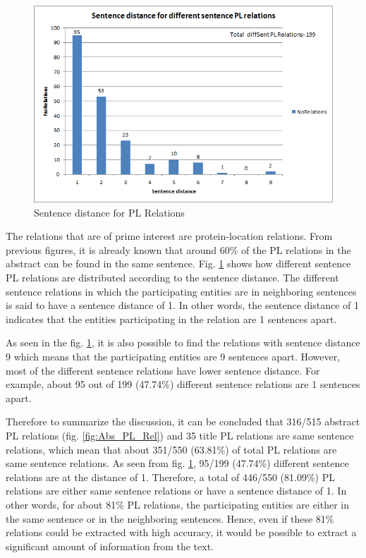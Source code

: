 \begin{figure}
\centering
\includegraphics[scale=0.7]{figures/SentenceDistance_PLRel.png}
\caption{Sentence distance for PL Relations}\label{fig:SentDistancePL}
\end{figure}

The relations that are of prime interest are protein-location relations. From previous figures, it is already known that around 60\% of the PL relations in the abstract can be found in the same sentence. Fig. \ref{fig:SentDistancePL} shows how different sentence PL relations are distributed according to the sentence distance. The different sentence relations in which the participating entities are in neighboring sentences is said to have a sentence distance of 1. In other words, the sentence distance of 1 indicates that the entities participating in the relation are 1 sentences apart. 

As seen in the fig. \ref{fig:SentDistancePL}, it is also possible to find the relations with sentence distance 9 which means that the participating entities are 9 sentences apart. However, most of the different sentence relations have lower sentence distance. For example, about 95 out of 199 (47.74\%) different sentence relations are 1 sentences apart.


Therefore to summarize the discussion, it can be concluded that 316/515 abstract PL relations (fig. \ref{fig:Abs_PL_Rel}) and 35 title PL relations are same sentence relations, which mean that about 351/550 (63.81\%) of total PL relations are same sentence relations. As seen from  fig. \ref{fig:SentDistancePL}, 95/199 (47.74\%) different sentence relations are at the distance of 1. Therefore, a total of 446/550 (81.09\%) PL relations are either same sentence relations or have a sentence distance of 1. In other words, for about 81\% PL relations, the participating entities are either in the same sentence or in the neighboring sentences. Hence, even if these 81\% relations could be extracted with high accuracy, it would be possible to extract a significant amount of information from the text.


